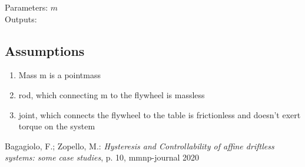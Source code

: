 \documentclass[10pt,a4paper]{article}
\begin{document}
	
	\noindent
	Parameters: $m$ %
	\\
	Outputs:
	
	
	\subsection{Assumptions} %
		\begin{enumerate} %
			\item Mass m is a pointmass
			\item rod, which connecting m to the flywheel is massless
			\item joint, which connects the flywheel to the table is frictionless and doesn't exert torque on the system
		\end{enumerate}
	
	
	
	\begin{thebibliography}{10}		
		Bagagiolo, F.; Zopello, M.: 
		\textit{Hysteresis and Controllability of affine driftless systems: some case studies}, p. 10, mmnp-journal 2020
	\end{thebibliography}
\end{document}
